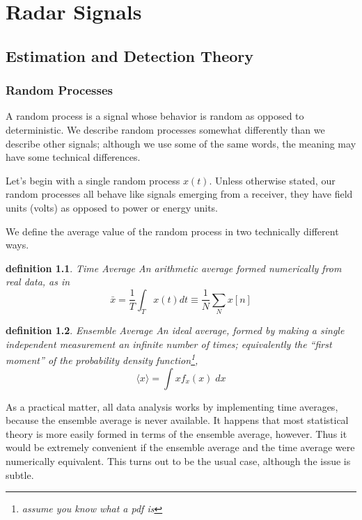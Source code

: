 
\newtheorem{definition}{definition}
\newtheorem{example}{example}

\part{Radar Signals}

\chapter{Estimation and Detection Theory}

\section{Random Processes}

A random process is a signal whose behavior is random as opposed to
deterministic.  We describe random processes somewhat differently than 
we describe other signals; although we use some of the same words, the
meaning may have some technical differences.

Let's begin with a single random process $x(t)$.  Unless otherwise
stated, our random processes all behave like signals emerging from a
receiver, they have field units (volts) as opposed to power or energy
units.

We define the average value of the random process in two technically
different ways.

\begin{definition}{Time Average}
An arithmetic average formed numerically from real data, as in
\begin{equation}
\bar{x} = \frac{1}{T}\int_T x(t) dt \equiv \frac{1}{N} \sum_N x[n]
\end{equation}
\end{definition}
\begin{definition}{Ensemble Average}
An ideal average, formed by making a single independent measurement
an infinite number of times; equivalently the ``first moment'' of the
probability density function\footnote{assume you know what a pdf is},
\begin{equation}
\langle x \rangle = \int x f_x(x)\; dx
\end{equation}
\end{definition}
As a practical matter, all data analysis works by implementing time
averages, because the ensemble average is never available.  It happens 
that most statistical theory is more easily formed in terms of the
ensemble average, however.  Thus it would be extremely convenient if
the ensemble average and the time average were numerically equivalent.
This turns out to be the usual case, although the issue is subtle.

